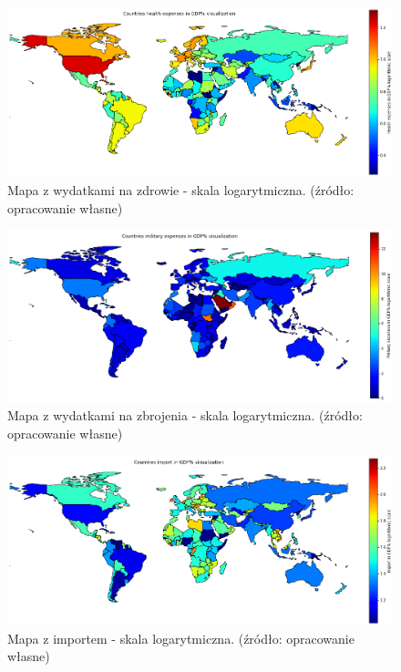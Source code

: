 \documentclass[11pt]{report}
\begin{document}
    \begin{figure}[!htp]
        \centering
        \includegraphics[width=\linewidth]{fig/CLUST/health2015.png}
        \caption{Mapa z wydatkami na zdrowie - skala logarytmiczna. (źródło: opracowanie własne)}
        \label{fig:clustHealth2015_log}
    \end{figure}

    \begin{figure}[!htp]
        \centering
        \includegraphics[width=\linewidth]{fig/CLUST/military2015.png}
        \caption{Mapa z wydatkami na zbrojenia - skala logarytmiczna. (źródło: opracowanie własne)}
        \label{fig:clustMilitary2015_log}
    \end{figure}

    \begin{figure}[!htp]
        \centering
        \includegraphics[width=\linewidth]{fig/CLUST/import2015.png}
        \caption{Mapa z importem - skala logarytmiczna. (źródło: opracowanie własne)}
        \label{fig:clustImport2015_log}
    \end{figure}
\end{document}
